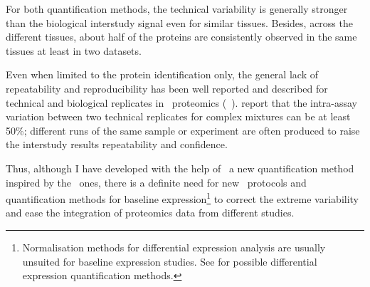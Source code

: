 For both quantification methods,
the technical variability is generally stronger
than the biological interstudy signal even for similar tissues.
Besides, across the different tissues,
about half of the proteins are consistently observed
in the same tissues at least in two datasets.\mybr\

Even when limited to the protein identification only,
the general lack of repeatability and reproducibility
has been well reported and described
for technical and biological replicates in \ms\ proteomics
(\eg\ \citet{Tu2014-yj,Tabb2010-ro}).
\citet{Canterbury2014-oi} report that
the intra-assay variation between two technical replicates for complex mixtures
can be at least 50\%;
different runs of the same sample or experiment are often produced to raise
the interstudy results repeatability and confidence.\mybr\

Thus, although I have developed with the help of \james\
a new quantification method inspired by the \Rnaseq\ ones,
there is a definite need for new \ms\ protocols and quantification methods
for baseline expression\footnote{Normalisation methods for differential expression
analysis are usually unsuited for baseline expression studies.
See \citet{Valikangas2018-yj} for possible differential expression quantification
methods.} to correct the extreme variability
and ease the integration of proteomics data from different studies.



